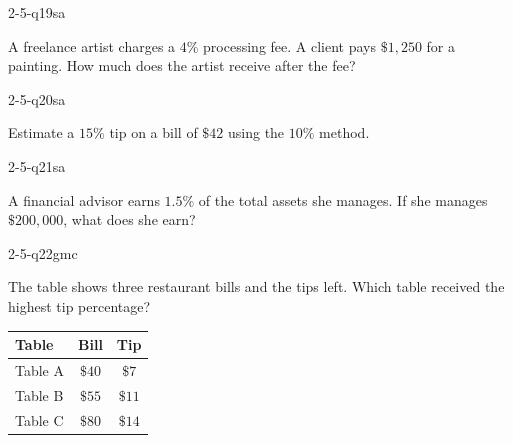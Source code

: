 \begin{practiceQuestion}{2-5-q19}{sa}
\begin{questionText}
A freelance artist charges a $4\%$ processing fee. A client pays $\$1{,}250$ for a painting. How much does the artist receive after the fee?
\end{questionText}
\end{practiceQuestion}

\begin{practiceQuestion}{2-5-q20}{sa}
\begin{questionText}
Estimate a $15\%$ tip on a bill of $\$42$ using the $10\%$ method.
\end{questionText}
\end{practiceQuestion}

\begin{practiceQuestion}{2-5-q21}{sa}
\begin{questionText}
A financial advisor earns $1.5\%$ of the total assets she manages. If she manages $\$200{,}000$, what does she earn?
\end{questionText}
\end{practiceQuestion}


\begin{practiceQuestion}{2-5-q22}{gmc}
\begin{questionText}
The table shows three restaurant bills and the tips left. Which table received the highest tip percentage?

\begin{center}
\begin{tabular}{|l|c|c|}
\hline
\textbf{Table} & \textbf{Bill} & \textbf{Tip} \\
\hline
Table A & $\$40$ & $\$7$ \\
\hline
Table B & $\$55$ & $\$11$ \\
\hline
Table C & $\$80$ & $\$14$ \\
\hline
\end{tabular}
\end{center}
\end{questionText}
\end{practiceQuestion}

